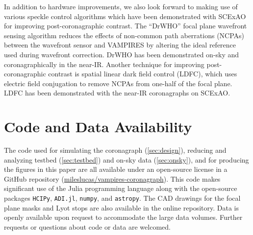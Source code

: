 \documentclass[]{spie}  %
\begin{document}
In addition to hardware improvements, we also look forward to making use of various speckle control algorithms which have been demonstrated with SCExAO for improving post-coronagraphic contrast. The ``DrWHO'' focal plane wavefront sensing algorithm\cite{skaf2021} reduces the effects of non-common path aberrations (NCPAs) between the wavefront sensor and VAMPIRES by altering the ideal reference used during wavefront correction. DrWHO has been demonstrated on-sky\cite{skaf2022} and coronagraphically in the near-IR\cite{skaf2021}. Another technique for improving post-coronagraphic contrast is spatial linear dark field control (LDFC), which uses electric field conjugation to remove NCPAs from one-half of the focal plane. LDFC has been demonstrated with the near-IR coronagraphs on SCExAO\cite{ahn2022}.


\appendix    %


\section{Code and Data Availability}\label{sec:code}

The code used for simulating the coronagraph (\autoref{sec:design}), reducing and analyzing testbed (\autoref{sec:testbed}) and on-sky data (\autoref{sec:onsky}), and for producing the figures in this paper are all available under an open-source license in a GitHub repository (\href{https://github.com/mileslucas/vampires-coronagraph}{mileslucas/vampires-coronagraph}). This code makes significant use of the Julia programming language\cite{bezanson2017} along with the open-source packages \texttt{HCIPy}\cite{por2018}, \texttt{ADI.jl}\cite{lucas2020}, \texttt{numpy}\cite{harris2020}, and \texttt{astropy}\cite{astropycollaboration2013,astropycollaboration2018}. The CAD drawings for the focal plane masks and Lyot stops are also available in the online repository. Data is openly available upon request to accommodate the large data volumes. Further requests or questions about code or data are welcomed.

\acknowledgments
\end{document}
